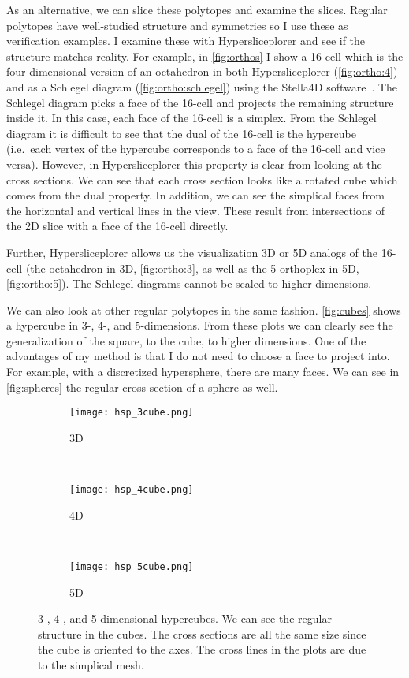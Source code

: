As an alternative, we can slice these polytopes and examine the slices.
Regular polytopes have well-studied structure and symmetries so I use these as
verification examples. I examine these with Hypersliceplorer and see if the
structure matches reality.  For example, in \autoref{fig:orthos} I show a
16-cell which is the four-dimensional version of an octahedron in both
Hypersliceplorer (\autoref{fig:ortho:4}) and as a Schlegel diagram (\autoref{fig:ortho:schlegel})
using the Stella4D software~\cite{Stella4D}. The
Schlegel diagram picks a face of the 16-cell and projects the remaining
structure inside it. In this case, each face of the 16-cell is a simplex. From
the Schlegel diagram it is difficult to see that the dual of the 16-cell is the
hypercube (i.e.\ each vertex of the hypercube corresponds to a face of the 16-cell and vice
versa). However, in Hypersliceplorer this property is clear from looking at the
cross sections. We can see that each cross section looks like a rotated cube
which comes from the dual property. In addition, we can see the simplical faces
from the horizontal and vertical lines in the view. These result from intersections of the
2D slice with a face of the 16-cell directly.

Further, Hypersliceplorer allows us the visualization 3D or 5D analogs of the 16-cell (the octahedron in 3D, \autoref{fig:ortho:3}, as well as the 5-orthoplex in 5D, \autoref{fig:ortho:5}). The Schlegel diagrams cannot be scaled to higher dimensions.

We can also look at other regular polytopes in the same fashion. 
\autoref{fig:cubes} shows a hypercube in 3-, 4-, and 5-dimensions. From these
plots we can clearly see the generalization of the square, to the cube, to
higher dimensions. One of the advantages of my method is that I do not need
to choose a face to project into. For example, with a discretized hypersphere,
there are many faces. We can see in \autoref{fig:spheres} the regular cross
section of a sphere as well. 

\begin{figure} 
  \centering
  \begin{subfigure}[b]{0.3\linewidth}
    \texttt{[image: hsp\_3cube.png]}
    \caption{3D}
    \label{fig:cubes:3d} 
  \end{subfigure} 
  ~
  \begin{subfigure}[b]{0.3\linewidth}
    \texttt{[image: hsp\_4cube.png]}
    \caption{4D}
    \label{fig:cubes:4d} 
  \end{subfigure}
  ~
  \begin{subfigure}[b]{0.3\linewidth}
    \texttt{[image: hsp\_5cube.png]}
    \caption{5D}
    \label{fig:cubes:5d} 
  \end{subfigure}
  \caption[3-, 4-, and 5-dimensional hypercubes.]{%
    3-, 4-, and 5-dimensional hypercubes. We can see the regular structure
    in the cubes. The cross sections are all the same size since the cube
    is oriented to the axes. The cross lines in the plots are due to the 
    simplical mesh.
  } 
  \label{fig:cubes} 
\end{figure}


